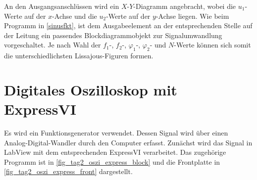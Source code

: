 \documentclass[
a4paper,
12pt,
pagesize,
ngerman
]{scrartcl}
\begin{document}
	\noindent An den Ausgangsanschlüssen wird ein $X$-$Y$-Diagramm angebracht, wobei die $u_1$-Werte auf der $x$-Achse und die $u_2$-Werte auf der $y$-Achse liegen. Wie beim Programm in \cref{sinusfkt}, ist dem Ausgabeelement an der entsprechenden Stelle auf der Leitung ein passendes Blockdiagrammobjekt zur Signalumwandlung vorgeschaltet. Je nach Wahl der $f_1$-, $f_2$-, $\varphi_1$-, $\varphi_2$- und $N$-Werte können sich somit die unterschiedlichsten Lissajous-Figuren formen.
	
	
	\section{Digitales Oszilloskop mit ExpressVI}
	Es wird ein Funktionsgenerator verwendet.
	Dessen Signal wird über einen Analog-Digital-Wandler durch den Computer erfasst.
	Zunächst wird das Signal in LabView mit dem entsprechenden ExpressVI verarbeitet.
	Das zugehörige Programm ist in \cref{fig_tag2_oszi_express_block} und die Frontplatte in \cref{fig_tag2_oszi_express_front} dargestellt.
	
\end{document}

